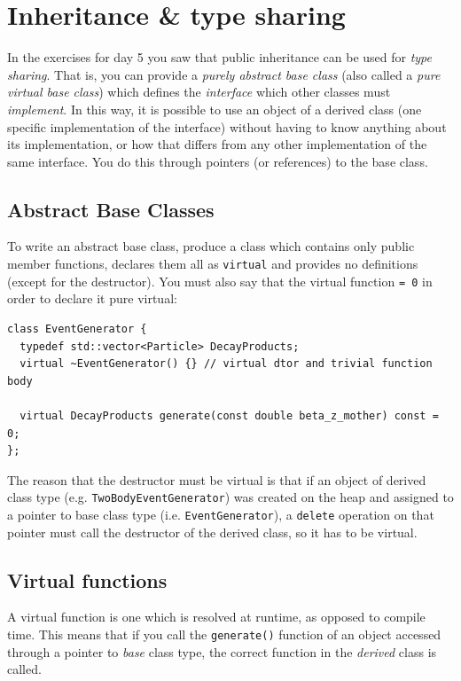 \documentclass[a4paper]{scrartcl}
\begin{document}
\section{Inheritance \& type sharing}\label{sec:inheritance}
In the exercises for day 5 you saw that public inheritance can be used for \emph{type sharing}. That is, you can provide a \emph{purely abstract base class} (also called a \emph{pure virtual base class}) which defines the \emph{interface} which other classes must \emph{implement}. In this way, it is possible to use an object of a derived class (one specific implementation of the interface) without having to know anything about its implementation, or how that differs from any other implementation of the same interface. You do this through pointers (or references) to the base class.

\subsection{Abstract Base Classes}
To write an abstract base class, produce a class which contains only public member functions, declares them all as \verb|virtual| and provides no definitions (except for the destructor). You must also say that the virtual function \verb|= 0| in order to declare it pure virtual:

\begin{verbatim}
class EventGenerator {
  typedef std::vector<Particle> DecayProducts;
  virtual ~EventGenerator() {} // virtual dtor and trivial function body

  virtual DecayProducts generate(const double beta_z_mother) const = 0;
};
\end{verbatim}

The reason that the destructor must be virtual is that if an object of derived class type (e.g. \verb|TwoBodyEventGenerator|) was created on the heap and assigned to a pointer to base class type (i.e. \verb|EventGenerator|), a \verb|delete| operation on that pointer must call the destructor of the derived class, so it has to be virtual.

\subsection{Virtual functions}
A virtual function is one which is resolved at runtime, as opposed to compile time. This means that if you call the \verb|generate()| function of an object accessed through a pointer to \emph{base} class type, the correct function in the \emph{derived} class is called.
\end{document}
